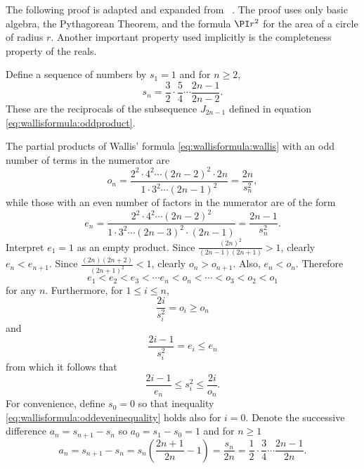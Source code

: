 \documentclass[12pt]{article}
\begin{document}
The following proof is adapted and expanded from~%
\cite{wastlund07}.  The proof uses only basic algebra, the Pythagorean
Theorem, and the formula \( \PI r^2 \) for the area of a circle of
radius \( r \).  Another important property used implicitly is the
completeness property of the reals.

Define a sequence of numbers by \( s_1 = 1 \) and for \( n \ge 2 \),
\begin{equation}
    \label{eq:wallisformula:defnsn} s_n = \frac{3}{2} \cdot \frac{5}{4}
    \cdots \frac{2n-1}{2n-2}.
\end{equation}
These are the reciprocals of the subsequence \( J_{2n-1} \) defined in
equation \eqref{eq:wallisformula:oddproduct}.

The partial products of Wallis' formula \eqref{eq:wallisformula:wallis}
with an odd number of terms in the numerator are
\begin{equation}
    \label{eq:wallisformula:defnodds} o_n = \frac{2^2 \cdot 4^2 \cdots (2n-2)^2
    \cdot 2n}{1 \cdot 3^2 \cdots (2n-1)^2} = \frac{2n}{s_n^2},
\end{equation}
while those with an even number of factors in the numerator are of the
form
\begin{equation}
    \label{eq:wallisformula:defnevens} e_n = \frac{2^2 \cdot 4^2 \cdots
    (2n-2)^2}{1 \cdot 3^2 \cdots (2n-3)^2 \cdot (2n-1)} = \frac{2n-1}{s_n^2}.
\end{equation}
Interpret \( e_1 = 1 \) as an empty product.  Since \( \frac{(2n)^2}{(2n-1)
(2n+1)} > 1 \), clearly \( e_n < e_{n+1} \).  Since \( \frac{(2n)(2n+2)}
{(2n+1)^2} < 1 \), clearly \( o_n > o_{n+1} \).  Also, \( e_n < o_n \).
Therefore
\[
    e_1 < e_2 < e_3 < \cdots e_n < o_n < \cdots < o_3 < o_2 < o_1
\] for any \( n \).  Furthermore, for \( 1 \le i \le n \),
\[
    \frac{2i}{s_i^2} = o_i \ge o_n
\] and
\[
    \frac{2i-1}{s_i^2} = e_i \le e_n
\] from which it follows that
\begin{equation}
    \label{eq:wallisformula:oddeveninequality} \frac{2i-1}{e_n} \le s_i^2
    \le \frac{2i}{o_n}.
\end{equation}
For convenience, define \( s_0 = 0 \) so that inequality \eqref{eq:wallisformula:oddeveninequality}
holds also for \( i = 0 \). Denote the successive difference \( a_n = s_
{n+1} - s_n \) so \( a_0 = s_1 - s_0 = 1 \) and for \( n \ge 1 \)
\[
    a_n = s_{n+1} - s_n = s_n\left( \frac{2n+1}{2n} - 1 \right) = \frac{s_n}
    {2n} = \frac{1}{2} \cdot \frac{3}{4} \cdots \frac{2n-1}{2n}.
\]
\end{document}
